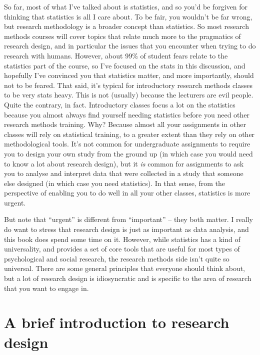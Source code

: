 \documentclass[
  a4paper,
]{book}
\begin{document}
So far, most of what I've talked about is statistics, and so you'd be
forgiven for thinking that statistics is all I care about. To be fair,
you wouldn't be far wrong, but research methodology is a broader concept
than statistics. So most research methods courses will cover topics that
relate much more to the pragmatics of research design, and in particular
the issues that you encounter when trying to do research with humans.
However, about 99\% of student fears relate to the statistics part of
the course, so I've focused on the stats in this discussion, and
hopefully I've convinced you that statistics matter, and more
importantly, should not to be feared. That said, it's typical for
introductory research methods classes to be very stats heavy. This is
not (usually) because the lecturers are evil people. Quite the contrary,
in fact. Introductory classes focus a lot on the statistics because you
almost always find yourself needing statistics before you need other
research methods training. Why? Because almost all your assignments in
other classes will rely on statistical training, to a greater extent
than they rely on other methodological tools. It's not common for
undergraduate assignments to require you to design your own study from
the ground up (in which case you would need to know a lot about research
design), but it \emph{is} common for assignments to ask you to analyse
and interpret data that were collected in a study that someone else
designed (in which case you need statistics). In that sense, from the
perspective of enabling you to do well in all your other classes,
statistics is more urgent.

But note that ``urgent'' is different from ``important'' -- they both
matter. I really do want to stress that research design is just as
important as data analysis, and this book does spend some time on it.
However, while statistics has a kind of universality, and provides a set
of core tools that are useful for most types of psychological and social
research, the research methods side isn't quite so universal. There are
some general principles that everyone should think about, but a lot of
research design is idiosyncratic and is specific to the area of research
that you want to engage in.

\hypertarget{sec-A-brief-introduction-to-research-design}{%
\chapter{A brief introduction to research
design}\label{sec-A-brief-introduction-to-research-design}}
\end{document}
